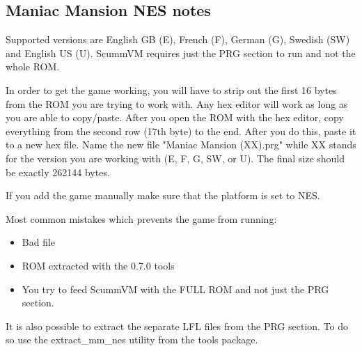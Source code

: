 \subsection{Maniac Mansion NES notes}

Supported versions are English GB (E), French (F), German (G), Swedish (SW)
and English US (U).
ScummVM requires just the PRG section to run and not the whole ROM.

In order to get the game working, you will have to strip out the first
16 bytes from the ROM you are trying to work with. Any hex editor will work
as long as you are able to copy/paste.  After you open the ROM with the
hex editor, copy everything from the second row (17th byte) to the end.
After you do this, paste it to a new hex file. Name the new file
"Maniac Mansion (XX).prg" while XX stands for the version you are working
with (E, F, G, SW, or U).  The final size should be exactly 262144 bytes.

If you add the game manually make sure that the platform is set to NES.

Most common mistakes which prevents the game from running:

\begin{itemize}
  \item Bad file
  \item ROM extracted with the 0.7.0 tools
  \item You try to feed ScummVM with the FULL ROM and not just the PRG section.
\end{itemize}

It is also possible to extract the separate LFL files from the PRG section.
To do so use the extract\_mm\_nes utility from the tools package.


